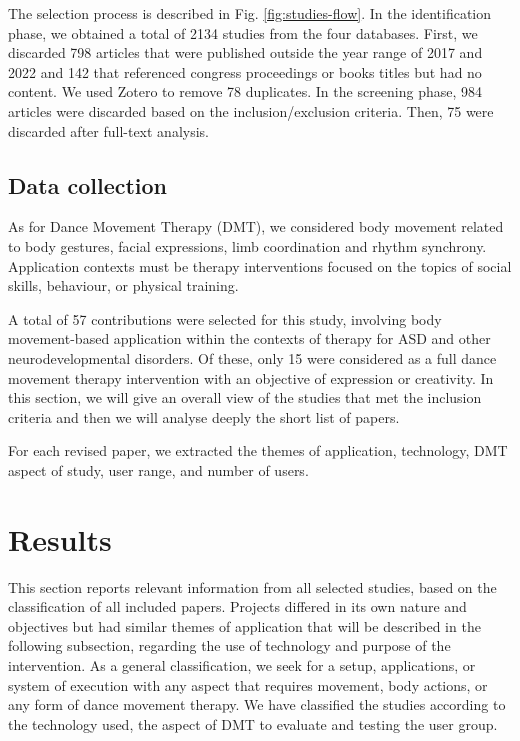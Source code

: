 \documentclass[a4paper,fleqn]{cas-sc}
\begin{document}
The selection process is described in Fig. \ref{fig:studies-flow}. 
In the identification phase, we obtained a total of 2134 studies from the four databases. First, we discarded 798 articles that were published outside the year range of 2017 and 2022 and 142 that referenced congress proceedings or books titles but had no content. We used Zotero to remove 78 duplicates. In the screening phase, 984 articles were discarded based on the inclusion/exclusion criteria. Then, 75 were discarded after full-text analysis. 

\subsection{Data collection}
As for Dance Movement Therapy (DMT), we considered body movement related to body gestures, facial expressions, limb coordination and rhythm synchrony. Application contexts must be therapy interventions focused on the topics of social skills, behaviour, or physical training.

A total of 57 contributions were selected for this study, involving body movement-based application within the contexts of therapy for ASD and other neurodevelopmental disorders. Of these, only 15 were considered as a full dance movement therapy intervention with an objective of expression or creativity. In this section, we will give an overall view of the studies that met the inclusion criteria and then we will analyse deeply the short list of papers.

For each revised paper, we extracted the themes of application, technology, DMT aspect of study, user range, and number of users.




\section{Results} 
\label{sec4:results}

This section reports relevant information from all selected studies, based on the classification of all included papers. Projects differed in its own nature and objectives but had similar themes of application that will be described in the following subsection, regarding the use of technology and purpose of the intervention. As a general classification, we seek for a setup, applications, or system of execution with any aspect that requires movement, body actions, or any form of dance movement therapy. We have classified the studies according to the technology used, the aspect of DMT to evaluate and testing the user group.
\end{document}
